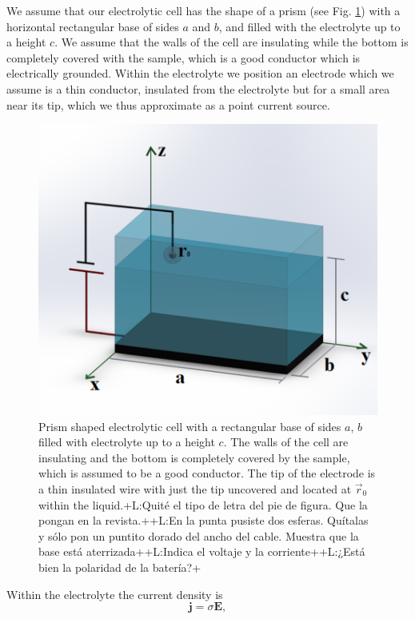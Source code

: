 \documentclass{article}
\newcommand{\notaL}[1]{{\color{blue}+L:#1+}}
\begin{document}
We assume that our electrolytic cell has the shape of a
prism (see Fig. \ref{f:celda}) with a horizontal rectangular base of sides $a$ and $b$, and
filled with the electrolyte up to a height $c$. We assume that the
walls of the cell are insulating while the bottom is completely
covered with the sample, which is a good conductor which is
electrically grounded. Within the electrolyte we position an electrode
which we assume is a thin conductor, insulated from the electrolyte
but for a small area near its tip, which we thus approximate as a
point current source.
\begin{figure}
  \centering
  \includegraphics[scale=.4]{Images/celdan}
  \caption{Prism shaped electrolytic cell with a rectangular base of
    sides $a$, $b$ filled with electrolyte up to a height $c$. The
    walls of the cell are insulating and the bottom is completely
    covered by the sample, which is assumed to be a good
    conductor. The tip of the electrode is a thin insulated wire with
    just the tip uncovered and located at $ \vec{r}_0 $ within the
    liquid.\notaL{Quité el tipo de letra del pie de figura. Que la pongan en la
      revista.}\notaL{En la punta pusiste dos esferas. Quítalas y sólo
    pon un puntito dorado del ancho del cable. Muestra que la base
    está aterrizada}\notaL{Indica el voltaje y la
    corriente}\notaL{¿Está bien la polaridad de la batería?}}
  \label{f:celda}
\end{figure}
Within the electrolyte the current density is
\begin{equation}
  \label{eq:j}
  \bm j=\sigma\bm E,
\end{equation}
\end{document}
